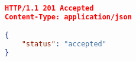 

\begin{lstlisting}[language=json,firstnumber=1]
HTTP/1.1 201 Accepted
Content-Type: application/json

{
    "status": "accepted"
}

\end{lstlisting}